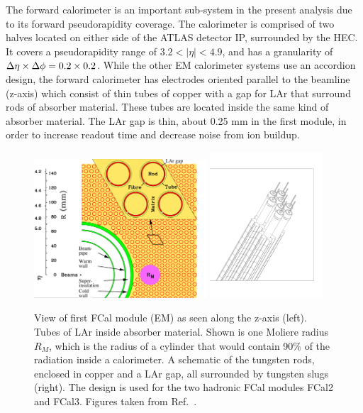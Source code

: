 {The forward calorimeter is an important sub-system in the present analysis due to its forward pseudorapidity coverage. The calorimeter is comprised of two halves located on either side of the ATLAS detector IP, surrounded by the HEC. It covers a pseudorapidity range of $3.2<|\eta|<4.9$, and has a granularity of $\mbox{$\Delta \eta$}\times\mbox{$\Delta \phi$}=0.2\times0.2$. While the other EM calorimeter systems use an accordion design, the forward calorimeter has electrodes oriented parallel to the beamline (z-axis) which consist of thin tubes of copper with a gap for LAr that surround rods of absorber material. These tubes are located inside the same kind of absorber material. The LAr gap is thin, about 0.25 mm in the first module, in order to increase readout time and decrease noise from ion buildup.

\begin{figure}
	\centering
	\includegraphics[width=0.575\textwidth]{figures/fcal_2.pdf} %
	\includegraphics[width=0.375\textwidth]{figures/fcal_3.pdf} %
	\caption{ View of first FCal module (EM) as seen along the z-axis (left). Tubes of LAr inside absorber material. Shown is one Moliere radius $R_{M}$, which is the radius of a cylinder that would contain 90\% of the radiation inside a calorimeter. A schematic of the tungsten rods, enclosed in copper and a LAr gap, all surrounded by tungsten slugs (right). The design is used for the two hadronic FCal modules FCal2 and FCal3. Figures taken from Ref.~\cite{Aad:2008zzm}.}	
	\label{fig:fcalcloseup}
\end{figure}

}
